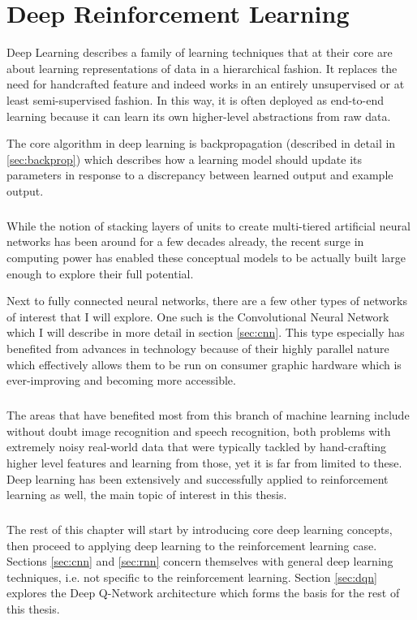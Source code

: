 \chapter{Deep Reinforcement Learning}
Deep Learning describes a family of learning techniques
that at their core are about learning representations of data
in a hierarchical fashion.
It replaces the need for handcrafted feature
and indeed works in an entirely unsupervised or at least
semi-supervised fashion.
In this way,
it is often deployed as end-to-end learning
because it can learn its own higher-level abstractions
from raw data.

The core algorithm in deep learning is backpropagation
(described in detail in \ref{sec:backprop})
which describes how a learning model should update its parameters
in response to a discrepancy between learned output
and example output.

\paragraph{}
While the notion of stacking layers of units
to create multi-tiered artificial neural networks
has been around for a few decades already,
the recent surge in computing power
has enabled these conceptual models
to be actually built large enough
to explore their full potential.

Next to fully connected neural networks,
there are a few other types of networks of interest
that I will explore.
One such is the Convolutional Neural Network
which I will describe in more detail in
section \ref{sec:cnn}.
This type especially has benefited from
advances in technology because of their highly
parallel nature which effectively allows them to be run
on consumer graphic hardware which is ever-improving
and becoming more accessible.

\paragraph{}
The areas that have benefited most from
this branch of machine learning
include without doubt
image recognition and speech recognition,
both problems with extremely noisy real-world data
that were typically tackled
by hand-crafting higher level features
and learning from those,
yet it is far from limited to these.
Deep learning has been extensively and successfully
applied to reinforcement learning as well,
the main topic of interest in this thesis.

\paragraph{}
The rest of this chapter will start by introducing
core deep learning concepts,
then proceed to applying deep learning
to the reinforcement learning case.
Sections \ref{sec:cnn} and \ref{sec:rnn}
concern themselves with general deep learning techniques,
i.e. not specific to the reinforcement learning.
Section \ref{sec:dqn}
explores the Deep Q-Network architecture
which forms the basis for the rest of this thesis.

